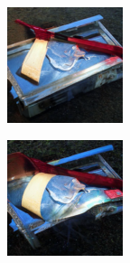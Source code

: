 \documentclass{article}
\begin{document}
\begin{figure}
\begin{subfigure}[b]{0.5\linewidth}
\begin{subfigure}[b]{0.242\linewidth}
        \end{subfigure}%
        \begin{subfigure}[b]{0.242\linewidth}
        \includegraphics[width=\linewidth]{figures/imagenet128/solver_samples/imagenet128_fm_ot_17_20.png}
        \end{subfigure}%
        \begin{subfigure}[b]{0.242\linewidth}
        \includegraphics[width=\linewidth]{figures/imagenet128/solver_samples/imagenet128_fm_ot_17_50.png}

\end{subfigure}
\end{subfigure}
\end{figure}
\end{document}
